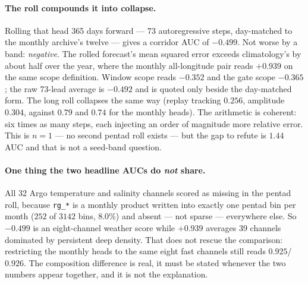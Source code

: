 \documentclass[10pt]{article}
\begin{document}
\paragraph{The roll compounds it into collapse.} Rolling that head 365 days
forward --- 73 autoregressive steps, day-matched to the monthly archive's
twelve --- gives a corridor AUC of $\mathbf{-0.499}$. Not worse by a band:
\emph{negative}. The rolled forecast's mean squared error exceeds
climatology's by about half over the year, where the monthly all-longitude
pair reads $+0.939$ on the same scope definition. Window scope reads
$-0.352$ and the gate scope $-0.365$; the raw 73-lead average is $-0.492$
and is quoted only beside the day-matched form. The long roll collapses the
same way (replay tracking $0.256$, amplitude $0.304$, against $0.79$ and
$0.74$ for the monthly heads). The arithmetic is coherent: six times as many
steps, each injecting an order of magnitude more relative error. This is
$n=1$ --- no second pentad roll exists --- but the gap to refute is $1.44$
AUC and that is not a seed-band question.

\paragraph{One thing the two headline AUCs do \emph{not} share.} All 32 Argo
temperature and salinity channels scored as missing in the pentad roll,
because \texttt{rg\_*} is a monthly product written into exactly one pentad
bin per month ($252$ of $3142$ bins, $8.0\%$) and absent --- not sparse ---
everywhere else. So $-0.499$ is an eight-channel weather score while
$+0.939$ averages 39 channels dominated by persistent deep density. That
does not rescue the comparison: restricting the monthly heads to the same
eight fast channels still reads $0.925$/$0.926$. The composition difference
is real, it must be stated whenever the two numbers appear together, and it
is not the explanation.
\end{document}
